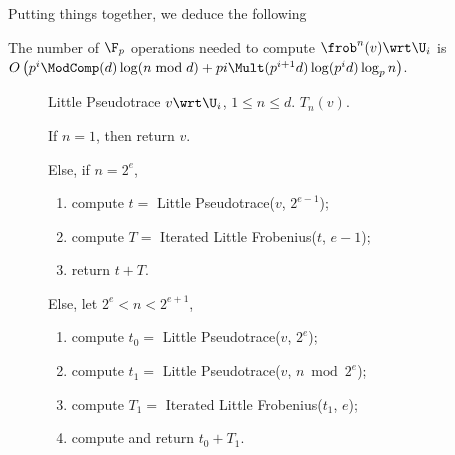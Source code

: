Putting things together, we deduce the following
\sloppy
\begin{corollary}
  The number of $\F_p$ operations needed to compute
  $\frob^n(v)\wrt\U_i$ is $O\left(p^i\ModComp(d)\log(n\bmod d) +
  pi\Mult(p^{i+1}d)\log(p^id)\log_pn\right)$.
\end{corollary}
\fussy




\begin{figure}[h]
  \begin{algorithm}
    {Little Pseudotrace}
    {$v\wrt\U_i$, $1\le n\le d$.}
    {$T_{n}(v)$.}
  \item \label{alg:l-pseudo:base}If $n = 1$, then return $v$.
  \item \label{alg:l-pseudo:even}Else, if $n=2^e$, 
    \begin{enumerate}
    \item \label{alg:l-pseudo:rec}compute $t = $ Little Pseudotrace($v$,
      $2^{e-1}$);
    \item \label{alg:l-pseudo:frob} compute $T = $ Iterated Little
      Frobenius($t$, $e-1$);
    \item \label{alg:l-pseudo:sum}return $t + T$.
    \end{enumerate}
  \item \label{alg:l-pseudo:odd}Else, let $2^e<n< 2^{e+1}$,
    \begin{enumerate}
    \item compute $t_0 = $ Little Pseudotrace($v$, $2^e$);
    \item compute $t_1 = $ Little Pseudotrace($v$, $n \bmod 2^e$);
    \item \label{alg:l-pseudo:frob2}compute $T_1 = $ Iterated Little
      Frobenius($t_1$, $e$);
    \item compute and return $t_0 + T_1$.
    \end{enumerate}
  \end{algorithm}
\end{figure}

